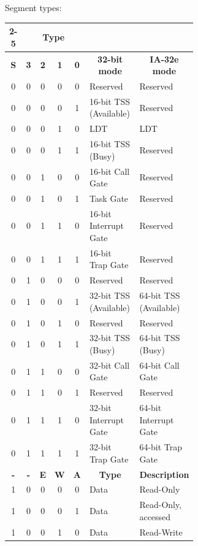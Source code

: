 \documentclass{article}
\newcommand{\layout}[1]{\parbox{\linewidth}{#1}}
\begin{document}
\layout{
  Segment types:
  \begin{table}[H]
    \centering
    \begin{tabular}{|c|c|c|c|c|p{0.303\linewidth}|p{0.303\linewidth}|}
      \cline{2-5} \multicolumn{1}{c|}{} & \multicolumn{4}{c|}{\textbf{Type}} & \multicolumn{2}{c}{} \\ \hline
      \textbf{S} & \textbf{3} & \textbf{2} & \textbf{1} & \textbf{0} & \multicolumn{1}{c|}{\textbf{32-bit mode}} & \multicolumn{1}{c|}{\textbf{IA-32e mode}} \\ \hline
      0 & 0 & 0 & 0 & 0 & Reserved & Reserved \\
      0 & 0 & 0 & 0 & 1 & 16-bit TSS (Available) & Reserved \\
      0 & 0 & 0 & 1 & 0 & LDT & LDT \\
      0 & 0 & 0 & 1 & 1 & 16-bit TSS (Busy) & Reserved \\
      0 & 0 & 1 & 0 & 0 & 16-bit Call Gate & Reserved \\
      0 & 0 & 1 & 0 & 1 & Task Gate & Reserved \\
      0 & 0 & 1 & 1 & 0 & 16-bit Interrupt Gate & Reserved \\
      0 & 0 & 1 & 1 & 1 & 16-bit Trap Gate & Reserved \\
      0 & 1 & 0 & 0 & 0 & Reserved & Reserved \\
      0 & 1 & 0 & 0 & 1 & 32-bit TSS (Available) & 64-bit TSS (Available) \\
      0 & 1 & 0 & 1 & 0 & Reserved & Reserved \\
      0 & 1 & 0 & 1 & 1 & 32-bit TSS (Busy) & 64-bit TSS (Busy) \\
      0 & 1 & 1 & 0 & 0 & 32-bit Call Gate & 64-bit Call Gate \\
      0 & 1 & 1 & 0 & 1 & Reserved & Reserved \\
      0 & 1 & 1 & 1 & 0 & 32-bit Interrupt Gate & 64-bit Interrupt Gate \\
      0 & 1 & 1 & 1 & 1 & 32-bit Trap Gate & 64-bit Trap Gate \\ \hline
      \textbf{-} & \textbf{-} & \textbf{E} & \textbf{W} & \textbf{A} & \multicolumn{1}{c|}{\textbf{Type}} & \multicolumn{1}{c|}{\textbf{Description}} \\ \hline
      1 & 0 & 0 & 0 & 0 & Data & Read-Only \\
      1 & 0 & 0 & 0 & 1 & Data & Read-Only, accessed \\
      1 & 0 & 0 & 1 & 0 & Data & Read-Write \\

\end{tabular}
\end{table}}
\end{document}
